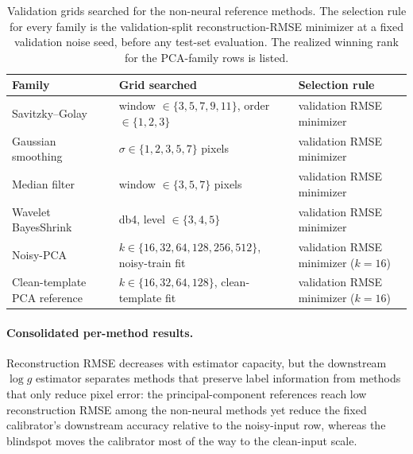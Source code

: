 \documentclass[twocolumn]{aastex7}
\begin{document}
\begin{table}
\centering
\small
\setlength{\tabcolsep}{4pt}
\caption{Validation grids searched for the non-neural reference methods. The selection rule for every family is the validation-split reconstruction-RMSE minimizer at a fixed validation noise seed, before any test-set evaluation. The realized winning rank for the PCA-family rows is listed.}
\label{tab:baseline_grids}
\begin{tabular}{lll}
\hline
Family & Grid searched & Selection rule \\
\hline
Savitzky--Golay & window $\in\{3,5,7,9,11\}$, order $\in\{1,2,3\}$ & validation RMSE minimizer \\
Gaussian smoothing & $\sigma\in\{1,2,3,5,7\}$ pixels & validation RMSE minimizer \\
Median filter & window $\in\{3,5,7\}$ pixels & validation RMSE minimizer \\
Wavelet BayesShrink & db4, level $\in\{3,4,5\}$ & validation RMSE minimizer \\
Noisy-PCA & $k\in\{16,32,64,128,256,512\}$, noisy-train fit & validation RMSE minimizer ($k=16$) \\
Clean-template PCA reference & $k\in\{16,32,64,128\}$, clean-template fit & validation RMSE minimizer ($k=16$) \\
\hline
\end{tabular}
\end{table}

\paragraph{Consolidated per-method results.}
Reconstruction RMSE decreases with estimator capacity, but the downstream $\log g$ estimator separates methods that preserve label information from methods that only reduce pixel error: the principal-component references reach low reconstruction RMSE among the non-neural methods yet reduce the fixed calibrator's downstream accuracy relative to the noisy-input row, whereas the blindspot moves the calibrator most of the way to the clean-input scale.
\end{document}
